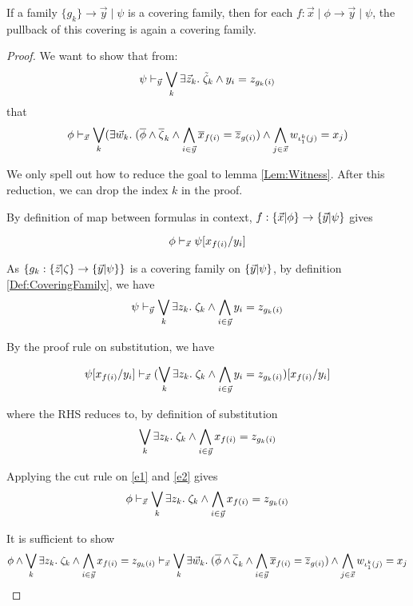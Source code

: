 \begin{lemma}\label{Lemma:stabCovFam}
  If a family $\{g_k\}\to \vec{y}\mid \psi$ is a covering family,
  then for each $f: \vec{x}\mid \phi\to \vec{y}\mid\psi$, the pullback of this covering is again a covering family.
\end{lemma}
\begin{proof}
  We want to show that from:
  \[\psi\vdash_{\vec{y}} \bigvee_k \exists \vec{z}_k.\; \tilde{\zeta}_k\land y_i = z_{g_k(i)}\]
  that
  \[\phi \vdash_{\vec{x}} \bigvee_k (\exists\vec{w}_k.\;(\overline{\phi}\land \overline{\zeta}_k \land\bigwedge_{i\in \vec{y}} \overline{x}_{f(i)} = \overline{z}_{g(i)}) \land \bigwedge_{j\in\vec{x}}w_{{\iota^k_1(j)}} = x_j )\]

  We only spell out how to reduce the goal to lemma \ref{Lem:Witness}. After this reduction, we can drop the index $k$ in the proof.

  By definition of map between formulas in context, $f:\{ \vec{x} | \phi \}\to \{ \vec{y} | \psi \}$ gives

  \begin{equation}\label{e1}
   \phi\vdash_{\vec{x}} \psi[x_{f(i)}/y_i]
  \end{equation}


  As $\{g_k:\{ \vec{z} | \zeta \}\to \{ \vec{y} | \psi \}\}$ is a covering family on $\{ \vec{y} | \psi \}$, by definition \ref{Def:CoveringFamily}, we have
  \[\psi\vdash_{\vec{y}} \bigvee_k \exists z_k.\;\zeta_k \land \bigwedge_{i\in \vec{y}} y_i = z_{g_k(i)}\]

  By the proof rule on substitution, we have


  \begin{equation}\label{e2}
  \psi [x_{f(i)}/y_i]\vdash_{\vec{x}} (\bigvee_k \exists z_k.\;\zeta_k \land \bigwedge_{i\in \vec{y}} y_i = z_{g_k(i)})  [x_{f(i)}/y_i]
  \end{equation}


  where the RHS reduces to, by definition of substitution
  \[\bigvee_k \exists z_k.\;\zeta_k \land \bigwedge_{i\in \vec{y}} x_{f(i)} = z_{g_k(i)}\]

  Applying the cut rule on \ref{e1} and \ref{e2} gives
  \[\phi\vdash_{\vec{x}} \bigvee_k \exists z_k.\;\zeta_k \land \bigwedge_{i\in \vec{y}} x_{f(i)} = z_{g_k(i)}\]

  It is sufficient to show
  \begin{equation*}
    \phi\land \bigvee_k \exists z_k.\;\zeta_k \land \bigwedge_{i\in \vec{y}} x_{f(i)} = z_{g_k(i)}\vdash_{\vec{x}}
      \bigvee_k \exists \vec{w}_k. \;(\overline{\phi}\land \overline{\zeta}_k \land\bigwedge_{i\in \vec{y}} \overline{x}_{f(i)} = \overline{z}_{g(i)}) \land \bigwedge_{j\in\vec{x}}w_{{\iota^k_1(j)}} = x_j
  \end{equation*}


\end{proof}
